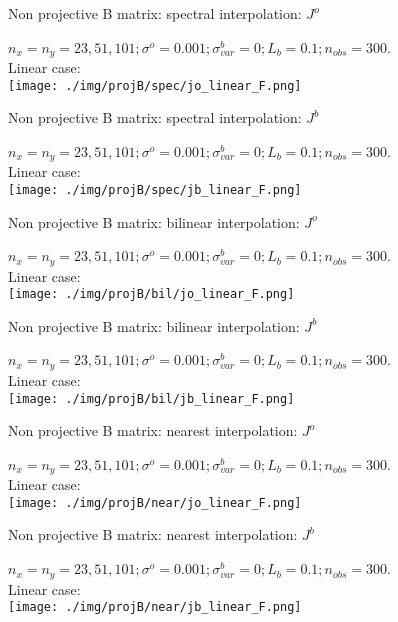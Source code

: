 \documentclass[francais]{beamer}
\begin{document}
\begin{frame}{Non projective B matrix: spectral interpolation: $J^o$}
\begin{center}
$n_x=n_y=23,51,101 ; \sigma^o = 0.001 ; \sigma^b_{var} = 0 ; L_b = 0.1 ; n_{obs}=300$.\\
Linear case:\\
\texttt{[image: ./img/projB/spec/jo\_linear\_F.png]}
\end{center}
\end{frame}
\begin{frame}{Non projective B matrix: spectral interpolation: $J^b$}
\begin{center}
$n_x=n_y=23,51,101 ; \sigma^o = 0.001 ; \sigma^b_{var} = 0 ; L_b = 0.1 ; n_{obs}=300$.\\
Linear case:\\
\texttt{[image: ./img/projB/spec/jb\_linear\_F.png]}
\end{center}
\end{frame}

\begin{frame}{Non projective B matrix: bilinear interpolation: $J^o$}
\begin{center}
$n_x=n_y=23,51,101 ; \sigma^o = 0.001 ; \sigma^b_{var} = 0 ; L_b = 0.1 ; n_{obs}=300$.\\
Linear case:\\
\texttt{[image: ./img/projB/bil/jo\_linear\_F.png]}
\end{center}
\end{frame}
\begin{frame}{Non projective B matrix: bilinear interpolation: $J^b$}
\begin{center}
$n_x=n_y=23,51,101 ; \sigma^o = 0.001 ; \sigma^b_{var} = 0 ; L_b = 0.1 ; n_{obs}=300$.\\
Linear case:\\
\texttt{[image: ./img/projB/bil/jb\_linear\_F.png]}
\end{center}
\end{frame}

\begin{frame}{Non projective B matrix: nearest interpolation: $J^o$}
\begin{center}
$n_x=n_y=23,51,101 ; \sigma^o = 0.001 ; \sigma^b_{var} = 0 ; L_b = 0.1 ; n_{obs}=300$.\\
Linear case:\\
\texttt{[image: ./img/projB/near/jo\_linear\_F.png]}
\end{center}
\end{frame}
\begin{frame}{Non projective B matrix: nearest interpolation: $J^b$}
\begin{center}
$n_x=n_y=23,51,101 ; \sigma^o = 0.001 ; \sigma^b_{var} = 0 ; L_b = 0.1 ; n_{obs}=300$.\\
Linear case:\\
\texttt{[image: ./img/projB/near/jb\_linear\_F.png]}
\end{center}
\end{frame}
\end{document}
